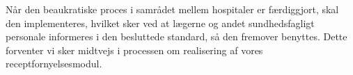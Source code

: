 Når den beaukratiske proces i samrådet mellem hospitaler er færdiggjort, skal den implementeres, hvilket sker ved at lægerne og andet sundhedsfagligt personale informeres i den besluttede standard, så den fremover benyttes. Dette forventer vi sker midtvejs i processen om realisering af vores receptfornyelsesmodul.
